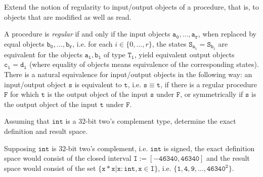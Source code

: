 \begin{Exercise}
    Extend the notion of regularity to input/output objects of a procedure, 
    that is, to objects that are modified as well as read.
\end{Exercise}

\begin{solution}
    A procedure is \textit{regular} if and only if the input objects 
    $\mathtt{a_{0}, \dots, a_{r}}$, when replaced by equal objects 
    $\mathtt{b_{0}, \dots, b_{r}}$, i.e. for each $i \in 
    \{0, \dots, r \}$, the states $\mathtt{S_{a_{i}} = S_{b_{i}}}$ are 
    equivalent for the objects $\mathtt{a_{i}, b_{i}}$ of type 
    $\mathtt{T_i}$, yield equivalent output objects $\mathtt{c_{i} = d_{i}}$ 
    (where equality of objects means equivalence of the corresponding 
    states). There is a natural equivalence for input/output objects 
    in the following way: an input/output object $\mathtt{s}$ is 
    equivalent to $\mathtt{t}$, i.e. $\mathtt{s \equiv t}$, if 
    there is a regular procedure $\mathtt{F}$ for which $\mathtt{t}$ is 
    the output object of the input $\mathtt{s}$ under $\mathtt{F}$, or symmetrically 
    if $\mathtt{s}$ is the output object of the input $\mathtt{t}$ under $\mathtt{F}$.
\end{solution}

\begin{Exercise}
    Assuming that $\mathtt{int}$ is a $32$-bit two's complement type, determine 
    the exact definition and result space.
\end{Exercise}

\begin{solution}
    Supposing $\mathtt{int}$ is $32$-bit two's complement, i.e. $\mathtt{int}$ is 
    signed, the exact definition space would consist of the closed interval 
    $\mathtt{I := [-46340, 46340]}$ and the result space would consist of the set 
    $\{\mathtt{x*x}| \mathtt{x : int}, \mathtt{x \in I}\}$, i.e. 
    $\{\mathtt{1}, \mathtt{4}, \mathtt{9}, \dots, \mathtt{46340^2}\}$.
\end{solution}